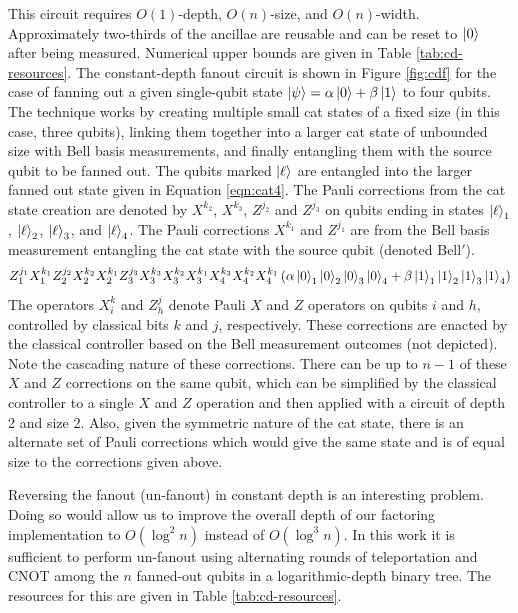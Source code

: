 \documentclass[twoside]{article}
\begin{document}
This circuit requires $O(1)$-depth, $O(n)$-size, and $O(n)$-width. Approximately
two-thirds of the ancillae are reusable and can be reset to $\left\vert{0}\right\rangle$ after
being measured. Numerical upper bounds are given in Table \ref{tab:cd-resources}.
The constant-depth fanout circuit is shown in Figure \ref{fig:cdf} for the case of fanning out a given single-qubit state
$\left\vert{\psi}\right\rangle = \alpha\left\vert{0}\right\rangle + \beta\left\vert{1}\right\rangle$ to four qubits.
The technique works by creating multiple small
cat states of a fixed size (in this case, three qubits), linking them
together into a larger cat state of unbounded size with Bell basis measurements,
and finally entangling them with the source qubit to be fanned out.
The qubits marked $\left\vert{\ell}\right\rangle$ are
entangled into the larger fanned out state given in Equation \ref{eqn:cat4}.
The Pauli corrections from the cat state creation are denoted by
$X^{k_2}$, $X^{k_3}$, $Z^{j_2}$ and $Z^{j_3}$ on qubits ending in
states $\left\vert{\ell}\right\rangle_1$, $\left\vert{\ell}\right\rangle_2$,
$\left\vert{\ell}\right\rangle_3$, and $\left\vert{\ell}\right\rangle_4$. The Pauli corrections
$X^{k_1}$ and $Z^{j_1}$ are from the Bell basis measurement
entangling the cat state with the source qubit (denoted $\text{Bell}'$).
\begin{equation}
Z_1^{j_1}X_1^{k_1}Z_2^{j_2}X_2^{k_2}X_2^{k_1}Z_{3}^{j_3}X_{3}^{k_3}X_{3}^{k_2}X_{3}^{k_1}X_{4}^{k_3}X_{4}^{k_2}X_{4}^{k_1}
\left(\alpha \left\vert{0}\right\rangle_1\left\vert{0}\right\rangle_2\left\vert{0}\right\rangle_3\left\vert{0}\right\rangle_4 + \beta \left\vert{1}\right\rangle_1\left\vert{1}\right\rangle_2\left\vert{1}\right\rangle_3\left\vert{1}\right\rangle_4 \right)
\label{eqn:cat4}
\end{equation}
%
The operators $X^k_i$ and $Z^j_{h}$ denote Pauli $X$ and $Z$ operators
on qubits $i$ and $h$, controlled by classical bits $k$ and $j$,
respectively. These corrections are enacted by the classical controller based on
the Bell measurement outcomes (not depicted).
Note the cascading nature of these corrections.
There can be up to
$n-1$ of these $X$ and $Z$
corrections on the same qubit, which can be simplified by the classical
controller to a single $X$ and $Z$ operation and then applied with a circuit of
depth 2 and size 2. Also, given the symmetric nature of the cat state, there
is an alternate set of Pauli corrections which would give the same state and
is of equal size to the corrections given above.

Reversing the fanout (un-fanout) in constant depth is an interesting
problem. Doing so would allow us to improve the overall depth of our
factoring implementation to $O(\log^2 n)$ instead of $O(\log^3 n )$.
In this work it is sufficient to perform un-fanout using alternating rounds of
teleportation and CNOT among the $n$ fanned-out qubits in a logarithmic-depth
binary tree. The resources for this are given in
Table \ref{tab:cd-resources}.
\end{document}
